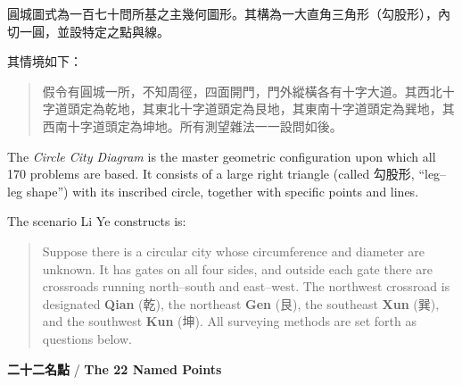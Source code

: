 \documentclass[11pt,a4paper]{article}
\newlength{\chwidth}
\newlength{\enwidth}
\newcommand{\zh}[1]{{\CJKfamily{sf}#1}}
\newenvironment{bilingual}{%
  \noindent
  \begin{minipage}[t]{\chwidth}%
  \small
}{%
  \end{minipage}%
}
\newcommand{\switchcolumn}{%
  \end{minipage}%
  \hfill%
  \begin{minipage}[t]{\enwidth}%
  \small
}
\begin{document}
\begin{bilingual}
\zh{圓城圖式為一百七十問所基之主幾何圖形。其構為一大直角三角形（勾股形），內切一圓，並設特定之點與線。}

\vspace{0.3cm}
\zh{其情境如下：}

\begin{quote}
\zh{假令有圓城一所，不知周徑，四面開門，門外縱橫各有十字大道。其西北十字道頭定為乾地，其東北十字道頭定為艮地，其東南十字道頭定為巽地，其西南十字道頭定為坤地。所有測望雜法一一設問如後。}
\end{quote}

\switchcolumn

The \textit{Circle City Diagram} is the master geometric configuration upon which all 170 problems are based. It consists of a large right triangle (called 勾股形, ``leg--leg shape'') with its inscribed circle, together with specific points and lines.

\vspace{0.3cm}
The scenario Li Ye constructs is:

\begin{quote}
Suppose there is a circular city whose circumference and diameter are unknown. It has gates on all four sides, and outside each gate there are crossroads running north--south and east--west. The northwest crossroad is designated \textbf{Qian} (乾), the northeast \textbf{Gen} (艮), the southeast \textbf{Xun} (巽), and the southwest \textbf{Kun} (坤). All surveying methods are set forth as questions below.
\end{quote}
\end{bilingual}

\vspace{0.3cm}

\noindent\textbf{\zh{二十二名點}} / \textbf{The 22 Named Points}
\end{document}
